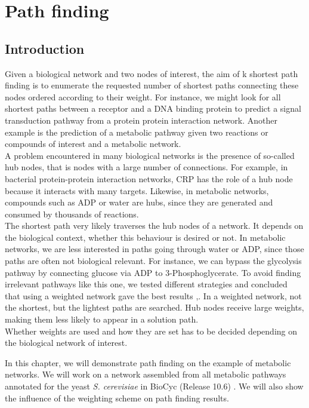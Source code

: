 \chapter{Path finding}

\section{Introduction}
Given a biological network and two nodes of interest, the aim of k shortest path finding is
to enumerate the requested number of shortest paths connecting these nodes ordered according to their weight.
For instance, we might look for all shortest paths between a receptor and a DNA binding protein to predict a signal
transduction pathway from a protein protein interaction network. Another example is the prediction of a metabolic pathway
given two reactions or compounds of interest and a metabolic network.\\
A problem encountered in many biological networks is the presence of so-called hub nodes, that is nodes with
a large number of connections. For example, in bacterial protein-protein interaction networks,
CRP has the role of a hub node because it interacts with many targets. Likewise,
in metabolic networks, compounds such as ADP or water are hubs, since they are generated and consumed by thousands of
reactions.\\
The shortest path very likely traverses the hub nodes of a network. It depends on the biological context, whether this
behaviour is desired or not. In metabolic networks, we are less interested in paths going through water or ADP, since
those paths are often not biological relevant. For instance, we can bypass the glycolysis pathway by connecting glucose
via ADP to 3-Phosphoglycerate. To avoid finding irrelevant pathways like this one,
we tested different strategies and concluded that using a weighted network gave the best results \cite{croes05},\cite{croes06}.
In a weighted network, not the shortest, but the lightest paths are searched. Hub nodes receive large weights, making them
less likely to appear in a solution path.\\
Whether weights are used and how they are set has to be decided depending on the biological network of interest.

In this chapter, we will demonstrate path finding on the example of metabolic networks. We will work on a network assembled
from all metabolic pathways annotated for the yeast \textit{S. cerevisiae} in BioCyc (Release 10.6) \cite{biocyc}. We will also show
the influence of the weighting scheme on path finding results.

